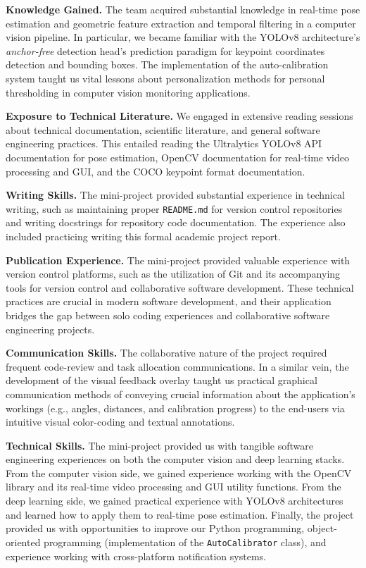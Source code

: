 \documentclass{llncs}
\begin{document}
\noindent\textbf{Knowledge Gained.}
The team acquired substantial knowledge in real-time pose estimation and geometric feature extraction and temporal filtering in a computer vision pipeline. In particular, we became familiar with the YOLOv8 architecture's \textit{anchor-free} detection head's prediction paradigm for keypoint coordinates detection and bounding boxes. The implementation of the auto-calibration system taught us vital lessons about personalization methods for personal thresholding in computer vision monitoring applications.

\noindent\textbf{Exposure to Technical Literature.}
We engaged in extensive reading sessions about technical documentation, scientific literature, and general software engineering practices. This entailed reading the Ultralytics YOLOv8 API documentation for pose estimation, OpenCV documentation for real-time video processing and GUI, and the COCO keypoint format documentation.

\noindent\textbf{Writing Skills.}
The mini-project provided substantial experience in technical writing, such as maintaining proper \texttt{README.md} for version control repositories and writing docstrings for repository code documentation. The experience also included practicing writing this formal academic project report.

\noindent\textbf{Publication Experience.}
The mini-project provided valuable experience with version control platforms, such as the utilization of Git and its accompanying tools for version control and collaborative software development. These technical practices are crucial in modern software development, and their application bridges the gap between solo coding experiences and collaborative software engineering projects.

\noindent\textbf{Communication Skills.}
The collaborative nature of the project required frequent code-review and task allocation communications. In a similar vein, the development of the visual feedback overlay taught us practical graphical communication methods of conveying crucial information about the application's workings (e.g., angles, distances, and calibration progress) to the end-users via intuitive visual color-coding and textual annotations.

\noindent\textbf{Technical Skills.}
The mini-project provided us with tangible software engineering experiences on both the computer vision and deep learning stacks. From the computer vision side, we gained experience working with the OpenCV library and its real-time video processing and GUI utility functions. From the deep learning side, we gained practical experience with YOLOv8 architectures and learned how to apply them to real-time pose estimation. Finally, the project provided us with opportunities to improve our Python programming, object-oriented programming (implementation of the \texttt{AutoCalibrator} class), and experience working with cross-platform notification systems.
\end{document}
